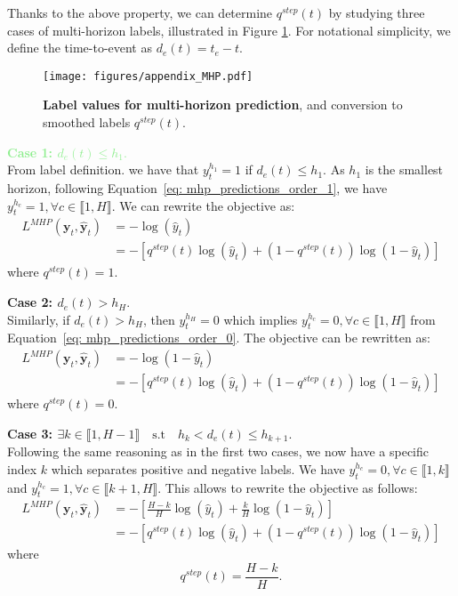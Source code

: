 \documentclass[nohyperref]{article}
\begin{document}
Thanks to the above property, we can determine $q^{step}(t)$ by studying three cases of multi-horizon labels, illustrated in Figure \ref{fig:appendix_MHP}. For notational simplicity, we define the time-to-event as $d_e( t) = t_e - t$.

\begin{figure}[h]
    \centering
    \texttt{[image: figures/appendix\_MHP.pdf]}
    \caption{\textbf{Label values for multi-horizon prediction}, and conversion to smoothed labels $q^{step}(t)$.}
    \label{fig:appendix_MHP}
\end{figure}
\textcolor{lightgreen}{\textbf{Case 1: $d_e( t) \leq h_1$}.}\\
From label definition. we have that $ y^{h_1}_{t} = 1$ if $d_e( t) \leq h_1$. As $h_1$ is the smallest horizon, following Equation~\ref{eq: mhp_predictions_order_1}, we have $ y^{h_c}_{t} = 1, \forall c \in \llbracket 1, H \rrbracket $. We can rewrite the objective as:
    \begin{align*}
             L^{MHP}(\mathbf{y}_{t},\hat{\mathbf{y}}_{t}) &= -\log(\hat{y}_{t})\\
                      &= -[q^{step}(t)\log(\hat{y}_{t}) + (1 - q^{step}(t))\log(1 - \hat{y}_{t})]
    \end{align*}
where $q^{step}(t) = 1$.

\textcolor{tabred}{\textbf{Case 2: $d_e( t)  >  h_H$}.} \\
Similarly, if $d_e( t)  >  h_H$, then $y^{h_H}_{t} = 0$ which implies $ y^{h_c}_{t} = 0, \forall c \in \llbracket 1, H \rrbracket $ from Equation~\ref{eq: mhp_predictions_order_0}. The objective can be rewritten as:
    \begin{align*}
             L^{MHP}(\mathbf{y}_{t},\hat{\mathbf{y}}_{t}) &= -\log(1-\hat{y}_{t})\\
                      &= -[q^{step}(t)\log(\hat{y}_{t}) + (1 - q^{step}(t))\log(1 - \hat{y}_{t})]
    \end{align*}
where $q^{step}(t) = 0$.

\textcolor{tabblue}{\textbf{Case 3: $\exists k \in \llbracket 1, H-1 \rrbracket \quad \mathrm{s.t} \quad h_k < d_e(t)  \leq   h_{k+1}$}.}\\
Following the same reasoning as in the first two cases, we now have a specific index $k$ which separates positive and negative labels. We have $y^{h_c}_{t} = 0, \forall c \in \llbracket 1, k \rrbracket$ and $y^{h_c}_{t} = 1, \forall c \in \llbracket k+1, H \rrbracket$. This allows to rewrite the objective as follows:
    \begin{align*}
            L^{MHP}(\mathbf{y}_{t},\hat{\mathbf{y}}_{t}) &= -[\frac{H-k}{H}\log(\hat{y}_{t}) + \frac{k}{H}\log(1-\hat{y}_{t})]\\
                      &= -[q^{step}(t)\log(\hat{y}_{t}) + (1 - q^{step}(t))\log(1 - \hat{y}_{t})]
    \end{align*}
where
\begin{equation*}
    q^{step}(t) = \frac{H-k}{H}.
\end{equation*}
\end{document}
